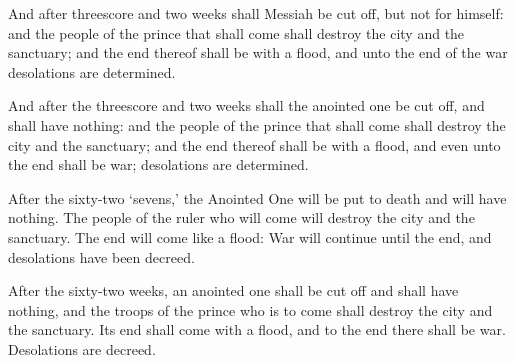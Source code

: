 			And after threescore and two weeks shall Messiah be cut off, but not for himself: and the people of the prince that shall come shall destroy the city and the sanctuary; and the end thereof shall be with a flood, and unto the end of the war desolations are determined.

			\begin{versebox}
					\item[BHS] 
					\item[LXX] 
					\item[ASV] And after the threescore and two weeks shall the anointed one be cut off, and shall have nothing: and the people of the prince that shall come shall destroy the city and the sanctuary; and the end thereof shall be with a flood, and even unto the end shall be war; desolations are determined.
					\item[NIV] After the sixty-two ‘sevens,’ the Anointed One will be put to death and will have nothing. The people of the ruler who will come will destroy the city and the sanctuary. The end will come like a flood: War will continue until the end, and desolations have been decreed.
					\item[NRSV] After the sixty-two weeks, an anointed one shall be cut off and shall have nothing, and the troops of the prince who is to come shall destroy the city and the sanctuary. Its end shall come with a flood, and to the end there shall be war. Desolations are decreed.
			\end{versebox}

